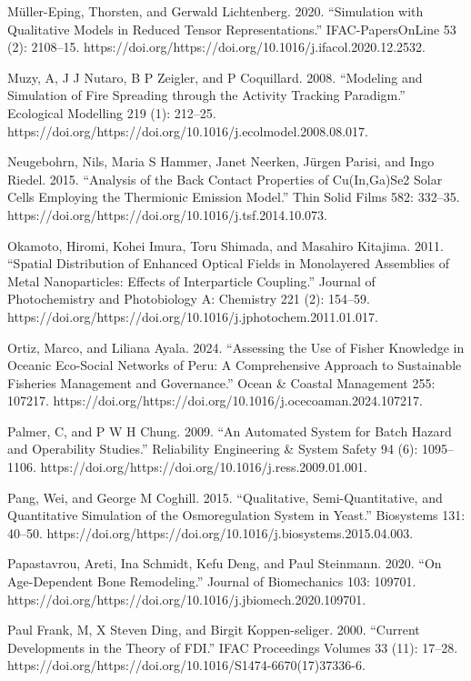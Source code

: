 \documentclass[utf8]{gradu3}
\begin{document}
Müller-Eping, Thorsten, and Gerwald Lichtenberg. 2020. “Simulation with Qualitative Models in Reduced Tensor Representations.” IFAC-PapersOnLine 53 (2): 2108–15. https://doi.org/https://doi.org/10.1016/j.ifacol.2020.12.2532.

Muzy, A, J J Nutaro, B P Zeigler, and P Coquillard. 2008. “Modeling and Simulation of Fire Spreading through the Activity Tracking Paradigm.” Ecological Modelling 219 (1): 212–25. https://doi.org/https://doi.org/10.1016/j.ecolmodel.2008.08.017.

Neugebohrn, Nils, Maria S Hammer, Janet Neerken, Jürgen Parisi, and Ingo Riedel. 2015. “Analysis of the Back Contact Properties of Cu(In,Ga)Se2 Solar Cells Employing the Thermionic Emission Model.” Thin Solid Films 582: 332–35. https://doi.org/https://doi.org/10.1016/j.tsf.2014.10.073.

Okamoto, Hiromi, Kohei Imura, Toru Shimada, and Masahiro Kitajima. 2011. “Spatial Distribution of Enhanced Optical Fields in Monolayered Assemblies of Metal Nanoparticles: Effects of Interparticle Coupling.” Journal of Photochemistry and Photobiology A: Chemistry 221 (2): 154–59. https://doi.org/https://doi.org/10.1016/j.jphotochem.2011.01.017.

Ortiz, Marco, and Liliana Ayala. 2024. “Assessing the Use of Fisher Knowledge in Oceanic Eco-Social Networks of Peru: 
A Comprehensive Approach to Sustainable Fisheries Management and Governance.” Ocean \& Coastal Management 255: 107217. https://doi.org/https://doi.org/10.1016/j.ocecoaman.2024.107217.

Palmer, C, and P W H Chung. 2009. “An Automated System for Batch Hazard and Operability Studies.” Reliability Engineering \& System Safety 94 (6): 1095–1106. https://doi.org/https://doi.org/10.1016/j.ress.2009.01.001.

Pang, Wei, and George M Coghill. 2015. “Qualitative, Semi-Quantitative, and Quantitative Simulation of the Osmoregulation System in Yeast.” Biosystems 131: 40–50. https://doi.org/https://doi.org/10.1016/j.biosystems.2015.04.003.

Papastavrou, Areti, Ina Schmidt, Kefu Deng, and Paul Steinmann. 2020. “On Age-Dependent Bone Remodeling.” Journal of Biomechanics 103: 109701. https://doi.org/https://doi.org/10.1016/j.jbiomech.2020.109701.

Paul Frank, Μ, X Steven Ding, and Birgit Koppen-seliger. 2000. “Current Developments in the Theory of FDI.” IFAC Proceedings Volumes 33 (11): 17–28. https://doi.org/https://doi.org/10.1016/S1474-6670(17)37336-6.
\end{document}
